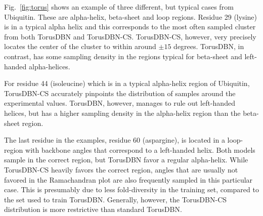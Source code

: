 Fig.~\ref{fig:torus} shows an example of three different, but typical cases from Ubiquitin. These are alpha-helix, beta-sheet and loop regions.
Residue 29 (lysine) is in a typical alpha helix and this corresponds to the most often sampled cluster from both TorusDBN and TorusDBN-CS. TorusDBN-CS, however, very precisely locates the center of the cluster to within around $\pm 15$ degrees. TorusDBN, in contrast, has some sampling density in the regions typical for beta-sheet and left-handed alpha-helices.

For residue 44 (isoleucine) which is in a typical alpha-helix region of Ubiquitin, TorusDBN-CS accurately pinpoints the distribution of samples around the experimental values.
TorusDBN, however, manages to rule out left-handed helices, but has a higher sampling density in the alpha-helix region than the beta-sheet region. 

The last residue in the examples, residue 60 (aspargine), is located in a loop-region with backbone angles that correspond to a left-handed helix.
Both models sample in the correct region, but TorusDBN favor a regular alpha-helix.
While TorusDBN-CS heavily favors the correct region, angles that are usually not favored in the Ramachandran plot are also frequently sampled in this particular case.
This is presumably due to less fold-diversity in the training set, compared to the set used to train TorusDBN. Generally, however, the TorusDBN-CS distribution is more restrictive than standard TorusDBN.


